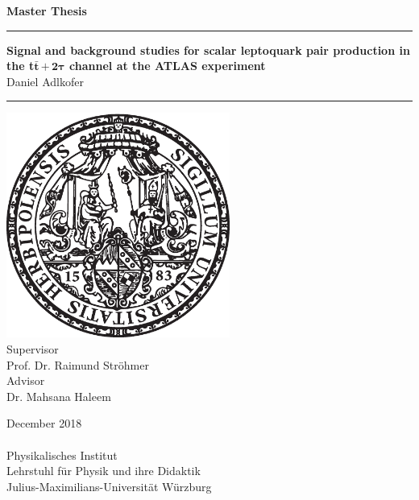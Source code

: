 \begin{titlepage}
  \vspace*{-7\baselineskip}
	\enlargethispage{100mm}
		\begin{center}
		\LARGE{\textbf{Master Thesis}\\}
		\vspace{3mm}	
		\textcolor{royalazure}{\noindent\rule{\textwidth}{3pt}}
		\huge{\textbf{Signal and background studies for scalar leptoquark pair production in the t$\bar{\textbf{t}}\,\mathbf{+\,2\tau}$ channel at the ATLAS experiment}\\}
		\vspace{3mm}
		\Large{Daniel Adlkofer\\}
		\textcolor{royalazure}{\noindent\rule{\textwidth}{3pt}}
		\vspace{3mm}
        \includegraphics[width=0.55\textwidth]{figures/neuSIEGEL.eps} \\
		\vspace{3mm}
		Supervisor \\
		\Large{Prof. Dr. Raimund Ströhmer\\}
               	\vspace{3mm}
                Advisor \\
    \Large{Dr. Mahsana Haleem\\}
               	\vspace{3mm}

		\vspace{5mm}
		December 2018\\
		  \noindent\hrulefill\\
		\vspace{3mm}
 		Physikalisches Institut\\
 		Lehrstuhl für Physik und ihre Didaktik\\
	    Julius-Maximilians-Universität Würzburg
	\end{center}
\end{titlepage}
\cleardoubleoddemptypage

